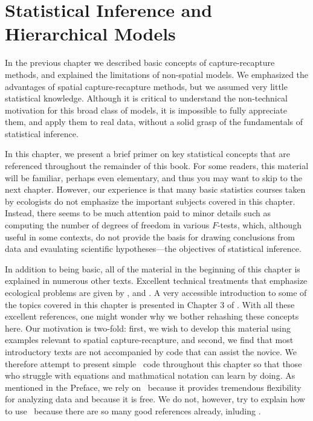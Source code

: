 \chapter{
Statistical Inference and Hierarchical Models
}
\label{chapt.modeling}


\vspace{.3in}

In the previous chapter we described basic concepts of
capture-recapture methods, and explained the limitations of
non-spatial models. We emphasized the advantages of
spatial capture-recapture methods, but we assumed very little
statistical knowledge. Although it is critical to understand the
non-technical motivation for this broad class of models, it is
impossible to fully appreciate them, and apply them to real data,
without a solid grasp of the fundamentals of statistical
inference.

In this chapter, we present a brief primer on key
statistical concepts that are referenced throughout the remainder of
this book. For some readers, this material will be familiar,
perhaps even elementary, and thus you may want to skip to the next
chapter. However, our experience is that many basic statistics courses
taken by ecologists do not emphasize the important subjects covered in
this chapter. Instead, there seems to be much attention paid to
minor details such as computing the number of degrees of freedom in
various $F$-tests, which, although useful in some contexts, do not
provide the basis for drawing conclusions from data and evaulating
scientific hypotheses---the objectives of statistical inference.

In addition to being basic, all of the material in the
beginning of this chapter is explained in numerous other
texts. %
Excellent technical treatments that emphasize ecological
problems are given by
\citet{williams_etal:2002}, \citet{royle_dorazio:2008} and
\citet{link_barker:2010}. A very accessible introduction to some of the
topics covered in this chapter is presented in Chapter 3 of
\citet{mackenzie_etal:2006}. With all these excellent references, one
might wonder why we bother rehashing these concepts here. Our motivation is
two-fold: first, we wish to develop this material using examples
relevant to spatial capture-recapture, and second, we find that most
introductory texts are not accompanied by code that can
assist the novice. We therefore attempt to present simple \R~code
throughout this chapter so that those who struggle with equations and
mathmatical notation can learn by doing. As mentioned in the Preface,
we rely on \R~because it provides tremendous flexibility for analyzing
data and because it is free. We do not, however, try to explain how to
use \R~because there are so many good references already, inluding
\citet{venables_ripley:2002,bolker:2008,venables_etal:2012}.

